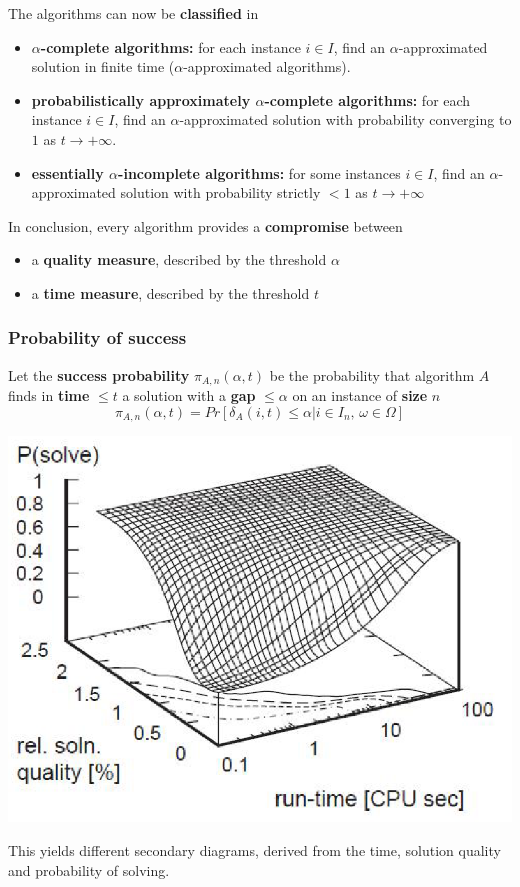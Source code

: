 The algorithms can now be \textbf{classified} in
\begin{itemize}
	\item \textbf{$\alpha$-complete algorithms:} for each instance $i \in I$, find an $\alpha$-approximated solution in finite time ($\alpha$-approximated algorithms).\\
	
	\item \textbf{probabilistically approximately $\alpha$-complete algorithms:} for each instance $i \in I$, find an $\alpha$-approximated solution with probability converging to $1$ as $t \rightarrow + \infty$.\\
	
	\item \textbf{essentially $\alpha$-incomplete algorithms:} for some instances $i \in I$, find an $\alpha$-approximated solution with probability strictly $< 1$ as $t \rightarrow +\infty$
\end{itemize}

In conclusion, every algorithm provides a \textbf{compromise} between
\begin{itemize}
	\item a \textbf{quality measure}, described by the threshold $\alpha$
	\item a \textbf{time measure}, described by the threshold $t$
\end{itemize}

\newpage

\subsubsection{Probability of success}
Let the \textbf{success probability} $\pi_{A, n} (\alpha, t)$ be the probability that algorithm $A$ finds in \textbf{time} $\leq t$ a solution with a \textbf{gap} $\leq \alpha$ on an instance of \textbf{size} $n$
$$ \pi_{A, n} (\alpha, t) = Pr \left[\delta_A (i, t) \leq \alpha | i \in I_n, \, \omega \in \Omega \right]$$
\begin{center}
	\includegraphics[width=0.7\columnwidth]{img/Psucc1}
\end{center}
This yields different secondary diagrams, derived from the time, solution quality and probability of solving.\\

